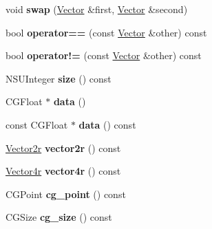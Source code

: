 \begin{DoxyCompactItemize}
\mbox{\label{class_p_o_p_1_1_vector_a2869bbed7055a9132e4ce891680eb411}} 
void {\bfseries swap} (\mbox{\hyperlink{class_p_o_p_1_1_vector}{Vector}} \&first, \mbox{\hyperlink{class_p_o_p_1_1_vector}{Vector}} \&second)
\item 
\mbox{\label{class_p_o_p_1_1_vector_af256cc244131e219401265dcb6dd2d1a}} 
bool {\bfseries operator==} (const \mbox{\hyperlink{class_p_o_p_1_1_vector}{Vector}} \&other) const
\item 
\mbox{\label{class_p_o_p_1_1_vector_a6c78a1b74257960f9a8c648631f4c055}} 
bool {\bfseries operator!=} (const \mbox{\hyperlink{class_p_o_p_1_1_vector}{Vector}} \&other) const
\item 
\mbox{\label{class_p_o_p_1_1_vector_a5c8659e4f2851f2850940385bd3813e1}} 
N\+S\+U\+Integer {\bfseries size} () const
\item 
\mbox{\label{class_p_o_p_1_1_vector_a94715b4c14dc8492f0c46f18abc0e5c8}} 
C\+G\+Float $\ast$ {\bfseries data} ()
\item 
\mbox{\label{class_p_o_p_1_1_vector_a04a5181b9f4c31f795893bf98c69736b}} 
const C\+G\+Float $\ast$ {\bfseries data} () const
\item 
\mbox{\label{class_p_o_p_1_1_vector_a3bc32a4174d61b7ada973bc0f874cb98}} 
\mbox{\hyperlink{struct_p_o_p_1_1_vector2}{Vector2r}} {\bfseries vector2r} () const
\item 
\mbox{\label{class_p_o_p_1_1_vector_accabfbab0fa4b930766919190f7a72d1}} 
\mbox{\hyperlink{struct_p_o_p_1_1_vector4}{Vector4r}} {\bfseries vector4r} () const
\item 
\mbox{\label{class_p_o_p_1_1_vector_a5ef0a612c5de21feadfce250de88f2ce}} 
C\+G\+Point {\bfseries cg\+\_\+point} () const
\item 
\mbox{\label{class_p_o_p_1_1_vector_ae35edcf895ec6034e4472b02e7ef38ea}} 
C\+G\+Size {\bfseries cg\+\_\+size} () const
\item 

\end{DoxyCompactItemize}
